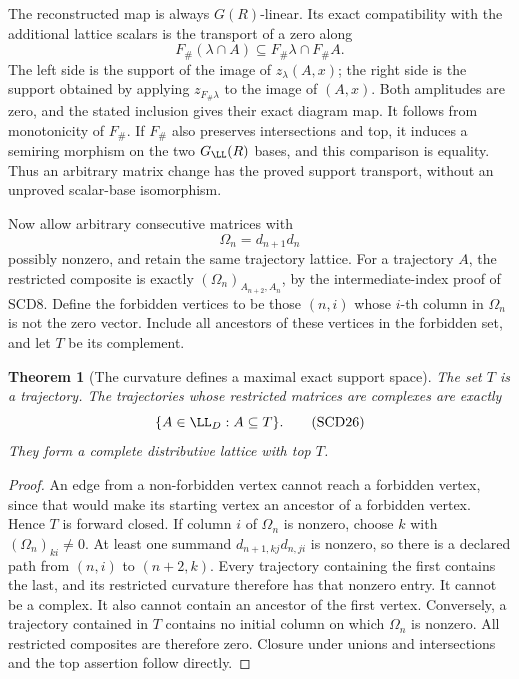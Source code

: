 \documentclass[11pt,a4paper]{article}
\newtheorem{theorem}{Theorem}[section]
\theoremstyle{definition}\newtheorem{definition}[theorem]{Definition}
\begin{document}
The reconstructed map is always \(G(R)\)-linear. Its exact
compatibility with the additional lattice scalars is the transport
of a zero along
\[
 F_\#(\lambda\cap A)\subseteq F_\#\lambda\cap F_\#A.
\]
The left side is the support of the image of \(z_\lambda(A,x)\);
the right side is the support obtained by applying
\(z_{F_\#\lambda}\) to the image of \((A,x)\). Both amplitudes
are zero, and the stated inclusion gives their exact diagram map.
It follows from monotonicity of \(F_\#\). If \(F_\#\) also
preserves intersections and top, it induces a semiring morphism
on the two \(G_{\LL}(R)\) bases, and this comparison is equality.
Thus an arbitrary matrix change has the proved support transport,
without an unproved scalar-base isomorphism.

Now allow arbitrary consecutive matrices with
\[
 \Omega_n=d_{n+1}d_n
 \tag{SCD25}
\]
possibly nonzero, and retain the same trajectory lattice.
For a trajectory \(A\), the restricted composite is exactly
\((\Omega_n)_{A_{n+2},A_n}\), by the intermediate-index proof of
SCD8. Define the forbidden vertices to be those \((n,i)\)
whose \(i\)-th column in \(\Omega_n\) is not the zero vector.
Include all ancestors of these vertices in the forbidden set,
and let \(T\) be its complement.

\begin{theorem}[The curvature defines a maximal exact support space]
The set \(T\) is a trajectory. The trajectories whose restricted
matrices are complexes are exactly
\[
 \{A\in\LL_D:A\subseteq T\}.
 \tag{SCD26}
\]
They form a complete distributive lattice with top \(T\).
\end{theorem}
\begin{proof}
An edge from a non-forbidden vertex cannot reach a forbidden
vertex, since that would make its starting vertex an ancestor
of a forbidden vertex. Hence \(T\) is forward closed.
If column \(i\) of \(\Omega_n\) is nonzero, choose \(k\)
with \((\Omega_n)_{ki}\ne0\). At least one summand
\(d_{n+1,kj}d_{n,ji}\) is nonzero, so there is a declared path
from \((n,i)\) to \((n+2,k)\). Every trajectory containing
the first contains the last, and its restricted curvature
therefore has that nonzero entry. It cannot be a complex.
It also cannot contain an ancestor of the first vertex.
Conversely, a trajectory contained in \(T\) contains no initial
column on which \(\Omega_n\) is nonzero. All restricted composites
are therefore zero. Closure under unions and intersections and
the top assertion follow directly.
\end{proof}
\end{document}
